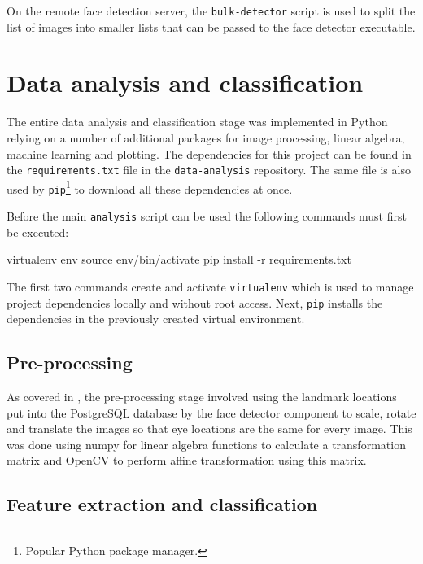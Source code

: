 On the remote face detection server, the \texttt{bulk-detector} script is used
to split the list of images into smaller lists that can be passed to the face
detector executable.

\section{Data analysis and classification}
The entire data analysis and classification stage was implemented in Python
relying on a number of additional packages for image processing, linear
algebra, machine learning and plotting. The dependencies for this project can
be found in the \texttt{requirements.txt} file in the \texttt{data-analysis}
repository. The same file is also used by \texttt{pip}\footnote{Popular Python
package manager.} to download all these dependencies at once.

Before the main \texttt{analysis} script can be used the following commands
must first be executed:
\begin{logs}
virtualenv env
source env/bin/activate
pip install -r requirements.txt
\end{logs}
The first two commands create and activate \texttt{virtualenv} which is used to
manage project dependencies locally and without root access. Next, \texttt{pip}
installs the dependencies in the previously created virtual environment.

\subsection{Pre-processing}
As covered in , the pre-processing stage involved
using the landmark locations put into the PostgreSQL database by the face
detector component to scale, rotate and translate the images so that eye
locations are the same for every image. This was done using numpy for linear
algebra functions to calculate a transformation matrix and OpenCV to perform
affine transformation using this matrix.

\subsection{Feature extraction and classification}

